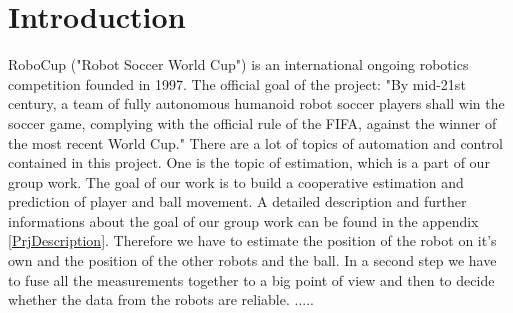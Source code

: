 
\chapter{Introduction}
RoboCup ("Robot Soccer World Cup") is an international ongoing robotics competition founded in 1997. The official goal of the project: "By mid-21st century, a team of fully autonomous humanoid robot soccer players shall win the soccer game, complying with the official rule of the FIFA, against the winner of the most recent World Cup." \cite{wwwRoboCup}
There are a lot of topics of automation and control contained in this project. One is the topic of estimation, which is a part of our group work. The goal of our work is to build a cooperative estimation and prediction of player and ball movement. A detailed description and further informations about the goal of our group work can be found in the appendix \ref{PrjDescription}.
Therefore we have to estimate the position of the robot on it's own and the position of the other robots and the ball. In a second step we have to fuse all the measurements together to a big point of view and then to decide whether the data from the robots are reliable.
.....




